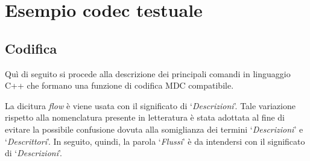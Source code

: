 \chapter{Esempio codec testuale}
\label{cap:codec_esempio}
\section{Codifica}
Quì di seguito si procede alla descrizione dei principali comandi in linguaggio
C++ che formano una funzione di codifica MDC compatibile.

\begin{notabene}
La dicitura \textit{flow} è viene usata con il significato di
`\emph{Descrizioni}'. Tale variazione rispetto alla nomenclatura presente in
letteratura è stata adottata al fine di evitare la possibile confusione dovuta
alla somiglianza dei termini `\emph{Descrizioni}' e `\emph{Descrittori}'. In seguito, quindi, la parola `\emph{Flussi}' è da intendersi con il significato di `\emph{Descrizioni}'.
\end{notabene}

